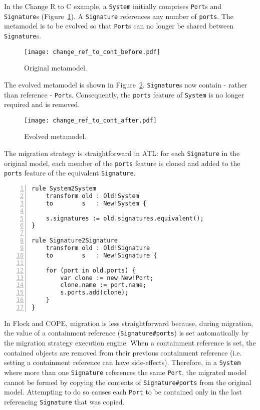 In the Change R to C example, a \texttt{System} initially comprises \texttt{Port}s and \texttt{Signature}s (Figure~\ref{fig:ref2cont_original_mm}). A \texttt{Signature} references any number of \texttt{ports}. The metamodel is to be evolved so that \texttt{Port}s can no longer be shared between \texttt{Signature}s.

\begin{figure}[htbp]
  \centering
  \texttt{[image: change\_ref\_to\_cont\_before.pdf]}
  \caption{Original metamodel.}
  \label{fig:ref2cont_original_mm}
\end{figure}

The evolved metamodel is shown in Figure~\ref{fig:ref2cont_evolved_mm}. \texttt{Signature}s now contain - rather than reference - \texttt{Port}s. Consequently, the \texttt{ports} feature of \texttt{System} is no longer required and is removed.

\begin{figure}[htbp]
  \centering
  \texttt{[image: change\_ref\_to\_cont\_after.pdf]}
  \caption{Evolved metamodel.}
  \label{fig:ref2cont_evolved_mm}
\end{figure}

The migration strategy is straightforward in ATL: for each \texttt{Signature} in the original model, each member of the \texttt{ports} feature is cloned and added to the \texttt{ports} feature of the equivalent \texttt{Signature}.

\begin{lstlisting}[basicstyle=\ttfamily\footnotesize, flexiblecolumns=true, numbers=left, nolol=true, caption=Change R to C model migration in ATL, label=lst:ref2cont_atl, language=ATL, tabsize=2]
rule System2System
	transform old : Old!System
	to        s   : New!System {
	
	s.signatures := old.signatures.equivalent();
}

rule Signature2Signature
	transform old : Old!Signature
	to        s   : New!Signature {
	
	for (port in old.ports) {
		var clone := new New!Port;
		clone.name := port.name;
		s.ports.add(clone);
	}
}
\end{lstlisting}

In Flock and COPE, migration is less straightforward because, during migration, the value of a containment reference (\texttt{Signature\#ports}) is set automatically by the migration strategy execution engine. When a containment reference is set, the contained objects are removed from their previous containment reference (i.e. setting a containment reference can have side-effects). Therefore, in a \texttt{System} where more than one \texttt{Signature} references the same \texttt{Port}, the migrated model cannot be formed by copying the contents of \texttt{Signature\#ports} from the original model. Attempting to do so causes each \texttt{Port} to be contained only in the last referencing \texttt{Signature} that was copied.

